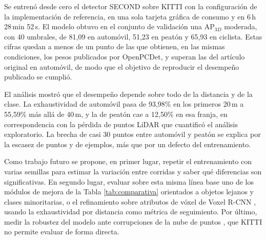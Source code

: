 \documentclass[11pt,letterpaper]{article}
\begin{document}
Se entrenó desde cero el detector SECOND sobre KITTI con la configuración de la implementación de referencia, en una sola tarjeta gráfica de consumo y en 6\,h 28\,min 52\,s. El modelo obtuvo en el conjunto de validación una AP$_{3D}$ moderada, con 40 umbrales, de 81,09 en automóvil, 51,23 en peatón y 65,93 en ciclista. Estas cifras quedan a menos de un punto de las que obtienen, en las mismas condiciones, los pesos publicados por OpenPCDet, y superan las del artículo original en automóvil, de modo que el objetivo de reproducir el desempeño publicado se cumplió.

El análisis mostró que el desempeño depende sobre todo de la distancia y de la clase. La exhaustividad de automóvil pasa de 93,98\% en los primeros 20\,m a 55,59\% más allá de 40\,m, y la de peatón cae a 12,50\% en esa franja, en correspondencia con la pérdida de puntos LiDAR que cuantificó el análisis exploratorio. La brecha de casi 30 puntos entre automóvil y peatón se explica por la escasez de puntos y de ejemplos, más que por un defecto del entrenamiento.

Como trabajo futuro se propone, en primer lugar, repetir el entrenamiento con varias semillas para estimar la variación entre corridas y saber qué diferencias son significativas. En segundo lugar, evaluar sobre esta misma línea base uno de los módulos de mejora de la Tabla \ref{tab:comparativa} orientados a objetos lejanos y clases minoritarias, o el refinamiento sobre atributos de vóxel de Voxel R-CNN \cite{deng2021}, usando la exhaustividad por distancia como métrica de seguimiento. Por último, medir la robustez del modelo ante corrupciones de la nube de puntos \cite{dong2023, li2026}, que KITTI no permite evaluar de forma directa.
\end{document}
